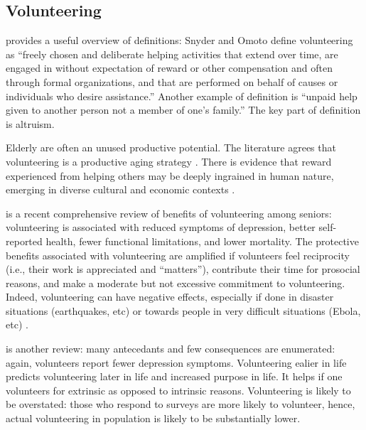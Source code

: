 \documentclass[10pt, letterpaper]{article}
\begin{document}
\begin{spacing}{1.4}
\section{Volunteering}

\citet[][p.177]{wilson12B} provides a useful overview of definitions: 
Snyder and Omoto  %
 define volunteering as
 ``freely chosen and deliberate helping activities that
extend over time, are engaged in without expectation of reward or other
compensation
and often through formal organizations, and that are performed on behalf of
causes or individuals who desire assistance.'' Another example of definition is ``unpaid help given
to another person not a member of one's family.'' The key part of definition is altruism.

Elderly are often an unused productive potential.
The literature agrees that volunteering is a productive aging strategy
\citep[e.g.,][]{wilson12B,hank09}. 
There is evidence that reward experienced from helping others may be deeply
ingrained in human nature, emerging in diverse cultural and economic contexts \citep{aknin13}.

\citet{anderson14} is a recent comprehensive review of benefits of
volunteering among seniors: volunteering is associated with reduced symptoms of
depression, better self-reported health, fewer functional limitations, and lower
mortality. The protective benefits associated with volunteering are amplified if
volunteers feel reciprocity (i.e., their work is appreciated and ``matters''), contribute their
time for prosocial reasons, and make a moderate but not excessive commitment to
volunteering. Indeed, volunteering can have negative effects, especially if done
in disaster situations (earthquakes, etc) or towards people in very difficult
situations (Ebola, etc) \citep{wilson12B}.

\citet{wilson12B} is another review: many antecedants and few consequences are
enumerated: again, volunteers report fewer depression symptoms. Volunteering
ealier in life predicts volunteering later in life and increased purpose in
life. It helps if one volunteers for extrinsic as opposed to intrinsic reasons. 
Volunteering is likely to be overstated:  those who
respond to surveys are more likely to volunteer, hence, actual volunteering in
population is likely to be substantially lower. %



\end{spacing}
\end{document}
